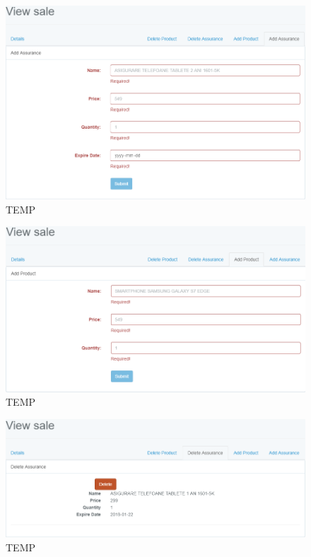 	\begin{figure}
		\includegraphics[width=\linewidth]{../imagini/sales_add_assurance.png}
		\caption{TEMP}
		\label{fig:TEMP}
	\end{figure}
	\begin{figure}
		\includegraphics[width=\linewidth]{../imagini/sales_add_product.png}
		\caption{TEMP}
		\label{fig:TEMP}
	\end{figure}
	\begin{figure}
		\includegraphics[width=\linewidth]{../imagini/sales_delete_assurance.png}
		\caption{TEMP}
		\label{fig:TEMP}
	\end{figure}
